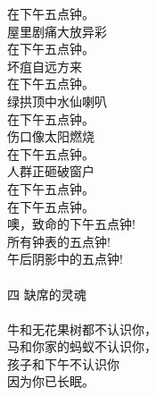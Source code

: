 \documentclass{article}
\begin{document}
\begin{center}
\begin{minipage}{0.5\linewidth}
\end{minipage}

\newpage

\begin{minipage}{0.5\linewidth}

\Large

在下午五点钟。 \\
屋里剧痛大放异彩 \\
在下午五点钟。 \\
坏疽自远方来 \\
在下午五点钟。 \\
绿拱顶中水仙喇叭 \\
在下午五点钟。 \\
伤口像太阳燃烧 \\
在下午五点钟。 \\
人群正砸破窗户 \\
在下午五点钟。 \\
在下午五点钟。 \\
噢，致命的下午五点钟! \\
所有钟表的五点钟! \\
午后阴影中的五点钟! \\
 \\
四 缺席的灵魂 \\
 \\
牛和无花果树都不认识你， \\
马和你家的蚂蚁不认识你， \\
孩子和下午不认识你 \\
因为你已长眠。 \\
 \\

\end{minipage}

\newpage

\begin{minipage}{0.5\linewidth}

\Large


\end{minipage}
\end{center}
\end{document}
